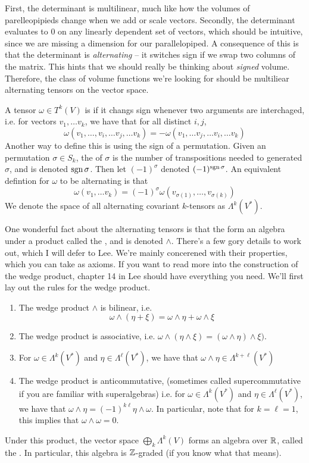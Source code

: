 First, the determinant is multilinear, much like how the volumes of
parelleopipieds change when we add or scale vectors. Secondly, the determinant
evaluates to $0$ on any linearly dependent set of vectors, which should be
intuitive, since we are missing a dimension for our parallelopiped. A
consequence of this is that the determinant is \emph{alternating} -- it
switches sign if we swap two columns of the matrix. This hints that we
should really be thinking about \emph{signed} volume. Therefore, the class
of volume functions we're looking for should be multiliear alternating
tensors on the vector space.
%
\begin{defn}
A tensor $\omega \in T^k(V)$ is  if it changs sign whenever
two arguments are interchaged, i.e. for vectors $v_1, \ldots v_k$, we have that
for all distinct $i,j$,
$$\omega(v_1,\ldots, v_i, \ldots v_j, \ldots v_k) = -\omega(v_1, \ldots v_j, \ldots v_i, \ldots v_k) $$
Another way to define this is using the sign of a permutation. Given an permutation
$\sigma \in S_k$, the  of $\sigma$ is the number of transpositions
needed to generated $\sigma$, and is denoted $\operatorname{sgn} \sigma$. Then let $(-1)^\sigma$
denoted $(-1)^{\operatorname{sgn}\sigma}$. An equivalent defintion for $\omega$ to be alternating
is that
$$\omega(v_1, \ldots v_k) = (-1)^\sigma\omega(v_{\sigma(1)}, \ldots, v_{\sigma(k)}) $$
We denote the space of all alternating covariant $k$-tensors as $\Lambda^k(V^*)$.
\end{defn}
%
One wonderful fact about the alternating tensors is that the form an algebra under
a product called the , and is denoted $\wedge$.
There's a few gory details to work out, which I will defer to Lee. We're mainly
concerened with their properties, which you can take as axioms.
If you want to read more into the construction of the wedge product,
chapter 14 in Lee should have everything you need.
%
We'll first lay out the rules for the wedge product.
\begin{enumerate}
  \item The wedge product $\wedge$ is bilinear, i.e.
  $$\omega \wedge (\eta + \xi) = \omega \wedge \eta + \omega \wedge \xi $$
  \item The wedge product is associative, i.e. $\omega \wedge (\eta \wedge \xi)
  = (\omega \wedge \eta) \wedge \xi)$.
  \item For $\omega \in \Lambda^k(V^*)$
  and $\eta \in \Lambda^\ell(V^*)$, we have that
  $\omega \wedge \eta \in \Lambda^{k + \ell}(V^*)$
  \item The wedge product is anticommutative, (sometimes called supercommutative
  if you are familiar with superalgebras) i.e. for $\omega \in \Lambda^k(V^*)$
  and $\eta \in \Lambda^\ell(V^*)$, we have that
  $\omega \wedge \eta = (-1)^{k\ell}\eta \wedge \omega$. In particular,
  note that for $k = \ell = 1$, this implies that $\omega \wedge \omega = 0$.
\end{enumerate}
%
Under this product, the vector space $\bigoplus_{k} \Lambda^k(V)$ forms an
algebra over $\mathbb{R}$, called the . In particular, this algebra
is $\mathbb{Z}$-graded (if you know what that means).

